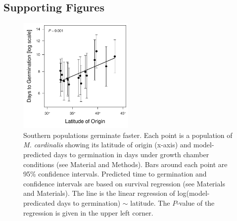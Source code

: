 \documentclass[11pt, oneside]{article}
\begin{document}
\clearpage


\subsection*{Supporting Figures}


	
\begin{figure}[h!]
	\centerline{\includegraphics[width=0.5\textwidth]{Figures/FigureS_GermLat.pdf}}
	\fontsize{10}{12}
	\selectfont
	\caption[Southern populations germinate faster]{Southern populations germinate faster. Each point is a population of \textit{M. cardinalis} showing its latitude of origin (x-axis) and model-predicted days to germination in days under growth chamber conditions (see Material and Methods). Bars around each point are 95\% confidence intervals. Predicted time to germination and confidence intervals are based on survival regression (see Materials and Materials). The line is the linear regression of log(model-predicated days to germination) $\sim$ latitude. The $P$-value of the regression is given in the upper left corner.}
	\label{fig:FigS_GermLat}
\end{figure}
\end{document}
